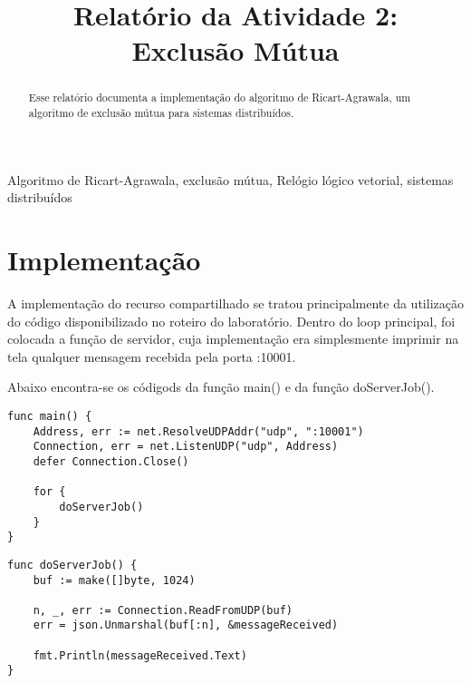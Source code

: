 \documentclass[conference]{IEEEtran}
\begin{document}
\title{Relatório da Atividade 2: \\ Exclusão Mútua\\
}

\author{
}

\maketitle

\begin{abstract}
Esse relatório documenta a implementação do algoritmo de Ricart-Agrawala, um algoritmo de exclusão mútua para sistemas distribuídos.
\end{abstract}

\begin{IEEEkeywords}
Algoritmo de Ricart-Agrawala, exclusão mútua, Relógio lógico vetorial, sistemas distribuídos
\end{IEEEkeywords}

\section{Implementação}
	
	A implementação do recurso compartilhado se tratou principalmente da utilização do código disponibilizado no roteiro do laboratório. Dentro do loop principal, foi colocada a função de servidor, cuja implementação era simplesmente imprimir na tela qualquer mensagem recebida pela porta :10001.
	
	Abaixo encontra-se os códigods da função main() e da função doServerJob().
	
\begin{lstlisting}
func main() {
	Address, err := net.ResolveUDPAddr("udp", ":10001")
	Connection, err = net.ListenUDP("udp", Address)
	defer Connection.Close()

	for {
		doServerJob()
	}
}
\end{lstlisting}

\begin{lstlisting}
func doServerJob() {
	buf := make([]byte, 1024)

	n, _, err := Connection.ReadFromUDP(buf)
	err = json.Unmarshal(buf[:n], &messageReceived)

	fmt.Println(messageReceived.Text)
}
\end{lstlisting}
\end{document}
